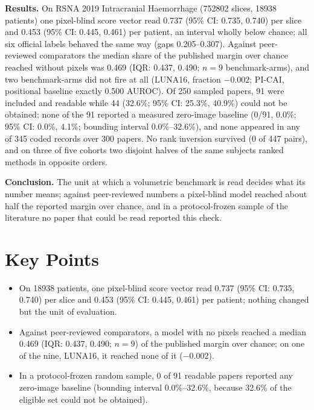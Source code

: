 \documentclass[11pt,a4paper]{article}
\begin{document}
\textbf{Results.} On RSNA 2019 Intracranial Haemorrhage (\num{752802} slices,
\num{18938} patients) one pixel-blind score vector read 0.737 (95\% CI: 0.735,
0.740) per slice and 0.453 (95\% CI: 0.445, 0.461) per patient, an interval
wholly below chance; all six official labels behaved the same way (gaps
0.205--0.307). Against peer-reviewed comparators the median share of the
published margin over chance reached without pixels was 0.469 (IQR: 0.437, 0.490;
$n=9$ benchmark-arms), and two benchmark-arms did not fire at all (LUNA16,
fraction $-0.002$; PI-CAI, positional baseline exactly 0.500 AUROC). Of 250 sampled papers, 91 were included and readable while 44 (32.6\%;
95\% CI: 25.3\%, 40.9\%) could not be obtained; none of the 91 reported a measured
zero-image baseline (0/91, 0.0\%; 95\% CI: 0.0\%, 4.1\%; bounding interval
0.0\%--32.6\%), and none appeared in any of 345 coded records over 300 papers. No
rank inversion survived (0 of 447 pairs), and on three of five cohorts two
disjoint halves of the same subjects ranked methods in opposite orders.

\textbf{Conclusion.} The unit at which a volumetric benchmark is read decides what
its number means; against peer-reviewed numbers a pixel-blind model reached about
half the reported margin over chance, and in a protocol-frozen sample of the
literature no paper that could be read reported this check.

\vspace{0.6em}

\section*{Key Points}

\begin{itemize}\setlength{\itemsep}{0.2em}
\item On \num{18938} patients, one pixel-blind score vector read 0.737 (95\% CI:
0.735, 0.740) per slice and 0.453 (95\% CI: 0.445, 0.461) per patient; nothing
changed but the unit of evaluation.
\item Against peer-reviewed comparators, a model with no pixels reached a median
0.469 (IQR: 0.437, 0.490; $n=9$) of the published margin over chance; on one of
the nine, LUNA16, it reached none of it ($-0.002$).
\item In a protocol-frozen random sample, 0 of 91 readable papers reported any
zero-image baseline (bounding interval 0.0\%--32.6\%, because 32.6\% of the
eligible set could not be obtained).
\end{itemize}
\end{document}
